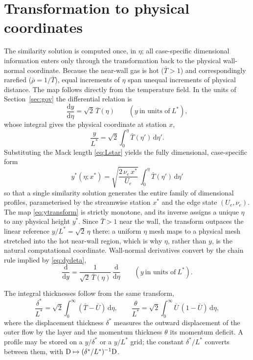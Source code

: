 \documentclass[11pt]{article}
\begin{document}
\section{Transformation to physical coordinates}\label{sec:transform}
The similarity solution is computed once, in $\eta$; all case-specific dimensional information enters
only through the transformation back to the physical wall-normal coordinate. Because the near-wall gas is
hot ($\bar T>1$) and correspondingly rarefied ($\bar\rho=1/\bar T$), equal increments of $\eta$ span
unequal increments of physical distance. The map follows directly from the temperature field. In the
units of Section~\ref{sec:gov} the differential relation is
\begin{equation}\label{eq:dydeta}
  \frac{\mathrm dy}{\mathrm d\eta}=\sqrt2\,\bar T(\eta)\qquad(y\ \text{in units of}\ L^*),
\end{equation}
whose integral gives the physical coordinate at station $x$,
\begin{equation}\label{eq:ytransform}
  \frac{y}{L^*}=\sqrt2\int_0^\eta \bar T(\eta')\,\mathrm d\eta' .
\end{equation}
Substituting the Mack length \eqref{eq:Lstar} yields the fully dimensional, case-specific form
\begin{equation}\label{eq:ydim}
  \boxed{\;y^*(\eta;x^*)=\sqrt{\frac{2\,\nu_e\,x^*}{U_e}}\,\int_0^\eta \bar T(\eta')\,\mathrm d\eta'\;}
\end{equation}
so that a single similarity solution generates the entire family of dimensional profiles, parameterised
by the streamwise station $x^*$ and the edge state $(U_e,\nu_e)$. The map \eqref{eq:ytransform} is
strictly monotone, and its inverse assigns a unique $\eta$ to any physical height $y^*$. Since
$\bar T>1$ near the wall, the transform outpaces the linear reference $y/L^*=\sqrt2\,\eta$ there: a
uniform $\eta$ mesh maps to a physical mesh stretched into the hot near-wall region, which is why $\eta$,
rather than $y$, is the natural computational coordinate. Wall-normal derivatives convert by the chain
rule implied by \eqref{eq:dydeta},
\begin{equation}\label{eq:chain}
  \frac{\mathrm d}{\mathrm dy}=\frac{1}{\sqrt2\,\bar T(\eta)}\,\frac{\mathrm d}{\mathrm d\eta}
  \qquad(y\ \text{in units of}\ L^*).
\end{equation}

The integral thicknesses follow from the same transform,
\begin{equation}\label{eq:thicknesses}
  \frac{\delta^*}{L^*}=\sqrt2\int_0^\infty(\bar T-\bar U)\,\mathrm d\eta,\qquad
  \frac{\theta}{L^*}=\sqrt2\int_0^\infty\bar U\,(1-\bar U)\,\mathrm d\eta,
\end{equation}
where the displacement thickness $\delta^*$ measures the outward displacement of the outer flow by the
layer and the momentum thickness $\theta$ its momentum deficit. A profile may be stored on a $y/\delta^*$
or a $y/L^*$ grid; the constant $\delta^*/L^*$ converts between them, with
$\mathrm{D}\mapsto(\delta^*/L^*)^{-1}\mathrm{D}$.
\end{document}
